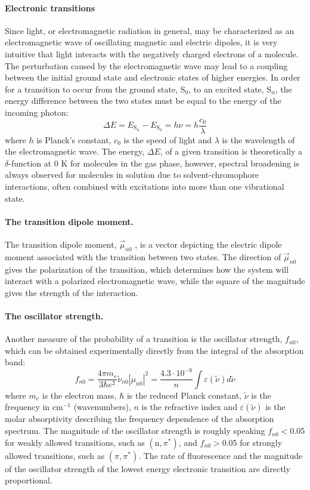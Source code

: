  \paragraph{Electronic transitions} Since light, or electromagnetic radiation in general, may be characterized as an electromagnetic wave of oscillating magnetic and electric dipoles, it is very intuitive that light interacts with the negatively charged electrons of a molecule. The perturbation caused by the electromagnetic wave may lead to a coupling between the initial ground state and electronic states of higher energies. In order for a transition to occur from the ground state, S$_0$, to an excited state, S$_n$, the energy difference between the two states must be equal to the energy of the incoming photon:
\begin{equation}
 \Delta E = E_{\mathrm{S}_n} - E_\mathrm{S_0} = h\nu = h\frac{c_0}{\lambda}
\end{equation}
 where $h$ is Planck's constant, $c_0$ is the speed of light and $\lambda$ is the wavelength of the electromagnetic wave. The energy, $\Delta E$, of a given transition is theoretically a $\delta$-function at 0 K for molecules in the gas phase, however, spectral broadening is always observed for molecules in solution due to solvent-chromophore interactions, often combined with excitations into more than one vibrational state.

 \paragraph{The transition dipole moment.} The transition dipole moment, $\vec{\mu}_{n0}$ , is a vector depicting the electric dipole moment associated with the transition between two states. The direction of $\vec{\mu}_{n0}$ gives the polarization of the transition, which determines how the system will interact with a polarized electromagnetic wave, while the square of the magnitude gives the strength of the interaction.

 \paragraph{The oscillator strength.} Another measure of the probability of a transition is the oscillator strength, $f_{n0}$, which can be obtained experimentally directly from the integral of the absorption band:
\begin{equation}
 f_{n0} = \frac{4\pi m_e}{3\hbar e^2}\tilde{\nu}_{n0}|\mu_{n0}|^2  = \frac{4.3\cdot10^{-9}}{n}\int \varepsilon(\tilde{\nu})d\tilde{\nu}
 \label{eq:OscStrength}
\end{equation}
 where $m_e$ is the electron mass, $\hbar$ is the reduced Planck constant, $\tilde{\nu}$ is the frequency in cm$^{-1}$ (wavenumbers), $n$ is the refractive index and $\varepsilon(\tilde{\nu})$ is the molar absorptivity describing the frequency dependence of the absorption spectrum. The magnitude of the oscillator strength is roughly speaking $f_{n0}<$0.05 for weakly allowed transitions, such as $(\mathrm{n},\pi^*)$, and $f_{n0}>$0.05 for strongly allowed transitions, such as $(\pi,\pi^*)$. The rate of fluorescence and the magnitude of the oscillator strength of the lowest energy electronic transition are directly proportional.

